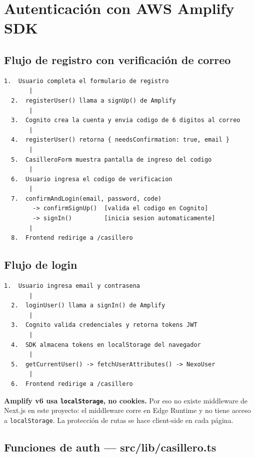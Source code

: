 \documentclass[12pt,a4paper]{article}
\begin{document}
\section{Autenticación con AWS Amplify SDK}

\subsection{Flujo de registro con verificación de correo}

\begin{lstlisting}[caption={Flujo de registro con verificación de correo (double opt-in)}, numbers=none]
  1.  Usuario completa el formulario de registro
       |
  2.  registerUser() llama a signUp() de Amplify
       |
  3.  Cognito crea la cuenta y envia codigo de 6 digitos al correo
       |
  4.  registerUser() retorna { needsConfirmation: true, email }
       |
  5.  CasilleroForm muestra pantalla de ingreso del codigo
       |
  6.  Usuario ingresa el codigo de verificacion
       |
  7.  confirmAndLogin(email, password, code)
        -> confirmSignUp()  [valida el codigo en Cognito]
        -> signIn()         [inicia sesion automaticamente]
       |
  8.  Frontend redirige a /casillero
\end{lstlisting}

\subsection{Flujo de login}

\begin{lstlisting}[caption={Flujo de inicio de sesión}, numbers=none]
  1.  Usuario ingresa email y contrasena
       |
  2.  loginUser() llama a signIn() de Amplify
       |
  3.  Cognito valida credenciales y retorna tokens JWT
       |
  4.  SDK almacena tokens en localStorage del navegador
       |
  5.  getCurrentUser() -> fetchUserAttributes() -> NexoUser
       |
  6.  Frontend redirige a /casillero
\end{lstlisting}

\begin{nexobox}
\textbf{Amplify v6 usa \texttt{localStorage}, no cookies.} Por eso no existe middleware
de Next.js en este proyecto: el middleware corre en Edge Runtime y no tiene acceso a
\texttt{localStorage}. La protección de rutas se hace client-side en cada página.
\end{nexobox}

\subsection{Funciones de auth --- src/lib/casillero.ts}
\end{document}
